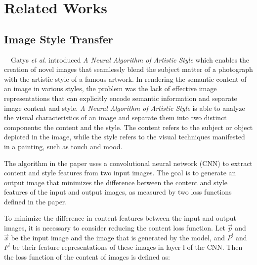 \chapter{Related Works}

\section{Image Style Transfer}
　Gatys \textit{et al}. \cite{Gatys_2016_CVPR} introduced \textit{A Neural Algorithm 
of Artistic Style} which enables the creation of novel images that seamlessly blend 
the subject matter of a photograph with the artistic style of a famous artwork.
In rendering the semantic content of an image in various styles, the problem was
the lack of effective image representations that can explicitly encode semantic 
information and separate image content and style. 
\textit{A Neural Algorithm of Artistic Style} \cite{Gatys_2016_CVPR} is able to 
analyze the visual characteristics of an image and separate them into two distinct 
components: the content and the style.
The content refers to the subject or object depicted in the image, while the style 
refers to the visual techniques manifested in a painting, such as touch and mood.

The algorithm in the paper uses a convolutional neural network (CNN) to extract
content and style features from two input images. The goal is to generate an 
output image that minimizes the difference between the content and style features 
of the input and output images, as measured by two loss functions defined in the 
paper. 

To minimize the difference in content features between the input and output images,
it is necessary to consider reducing the content loss function. 
Let $\vec{p}$ and $\vec{x}$ be the input image and the image that is generated by
the model, and  $P^l$ and $F^l$ be their feature representations of these images in 
layer l of the CNN. Then the loss function of the content of images is defined as:

